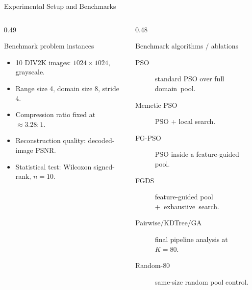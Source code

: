 \documentclass[10pt,aspectratio=169]{beamer}
\begin{document}
\begin{frame}{Experimental Setup and Benchmarks}
  \begin{columns}[T,onlytextwidth]
    \begin{column}{0.49\textwidth}
      \begin{block}{Benchmark problem instances}
        \begin{itemize}
          \item 10 DIV2K images: $1024\times1024$, grayscale.
          \item Range size 4, domain size 8, stride 4.
          \item Compression ratio fixed at $\approx3.28{:}1$.
          \item Reconstruction quality: decoded-image PSNR.
          \item Statistical test: Wilcoxon signed-rank, $n=10$.
        \end{itemize}
      \end{block}
    \end{column}
    \hfill
    \begin{column}{0.48\textwidth}
      \begin{exampleblock}{Benchmark algorithms / ablations}
        \begin{description}
          \item[PSO] standard PSO over full domain~pool.
          \item[Memetic PSO] PSO + local search.
          \item[FG-PSO] PSO inside a feature-guided pool.
          \item[FGDS] feature-guided pool +~exhaustive~search.
          \item[Pairwise/KDTree/GA] final pipeline analysis at $K=80$.
          \item[Random-80] same-size random pool control.
        \end{description}
      \end{exampleblock}
    \end{column}
  \end{columns}
\end{frame}
\end{document}
